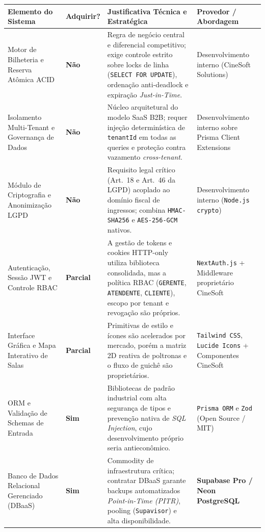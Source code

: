 {\fontsize{7.5pt}{9.2pt}\selectfont
\renewcommand{\arraystretch}{1.05}%
\setlength{\tabcolsep}{3.5pt}%
\begin{tabularx}{\textwidth}{>{\fontSemiBold\color{BrandNavy}\arraybackslash}m{3.0cm} C{1.6cm} Y >{\arraybackslash}m{3.0cm}}
\toprule
{}
\textbf{Elemento do Sistema} & \textbf{Adquirir?} & \textbf{Justificativa Técnica e Estratégica} & \textbf{Provedor / Abordagem} \\
\midrule
{}
Motor de Bilheteria e Reserva Atômica ACID & \textbf{Não} & Regra de negócio central e diferencial competitivo; exige controle estrito sobre locks de linha (\texttt{SELECT FOR UPDATE}), ordenação anti-deadlock e expiração \emph{Just-in-Time}. & Desenvolvimento interno (CineSoft Solutions) \\
\midrule
Isolamento Multi-Tenant e Governança de Dados & \textbf{Não} & Núcleo arquitetural do modelo SaaS B2B; requer injeção determinística de \texttt{tenantId} em todas as queries e proteção contra vazamento \emph{cross-tenant}. & Desenvolvimento interno sobre Prisma Client Extensions \\
\midrule
Módulo de Criptografia e Anonimização LGPD & \textbf{Não} & Requisito legal crítico (Art.~18 e Art.~46 da LGPD) acoplado ao domínio fiscal de ingressos; combina \texttt{HMAC-SHA256} e \texttt{AES-256-GCM} nativos. & Desenvolvimento interno (\texttt{Node.js crypto}) \\
\midrule
Autenticação, Sessão JWT e Controle RBAC & \textbf{Parcial} & A gestão de tokens e cookies HTTP-only utiliza biblioteca consolidada, mas a política RBAC (\texttt{GERENTE}, \texttt{ATENDENTE}, \texttt{CLIENTE}), escopo por tenant e revogação são próprios. & \texttt{NextAuth.js} + Middleware proprietário CineSoft \\
\midrule
Interface Gráfica e Mapa Interativo de Salas & \textbf{Parcial} & Primitivas de estilo e ícones são acelerados por mercado, porém a matriz 2D reativa de poltronas e o fluxo de guichê são proprietários. & \texttt{Tailwind CSS}, \texttt{Lucide Icons} + Componentes CineSoft \\
\midrule
ORM e Validação de Schemas de Entrada & \textbf{Sim} & Bibliotecas de padrão industrial com alta segurança de tipos e prevenção nativa de \emph{SQL Injection}, cujo desenvolvimento próprio seria antieconômico. & \texttt{Prisma ORM} e \texttt{Zod} (Open Source / MIT) \\
\midrule
Banco de Dados Relacional Gerenciado (DBaaS) & \textbf{Sim} & Commodity de infraestrutura crítica; contratar DBaaS garante backups automatizados \emph{Point-in-Time (PITR)}, pooling (\texttt{Supavisor}) e alta disponibilidade. & \textbf{Supabase Pro / Neon PostgreSQL} \\

\end{tabularx}}
